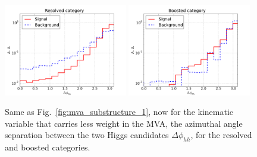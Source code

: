 \begin{figure}[t]
  \begin{center}
  \includegraphics[width=0.48\textwidth]{plots/DeltaPhi_HH_C1_res.pdf} 
  \includegraphics[width=0.48\textwidth]{plots/DeltaPhi_HH_C1_boosted.pdf} 
  \caption{\small Same as Fig.~\ref{fig:mva_substructure_1},
    now for the kinematic variable that carries less weight in the MVA,
    the azimuthal angle separation between the two Higgs candidates
    $\Delta\phi_{hh}$, for the resolved and boosted categories.
}
\label{fig:mva_substructure_2}
\end{center}
\end{figure}
